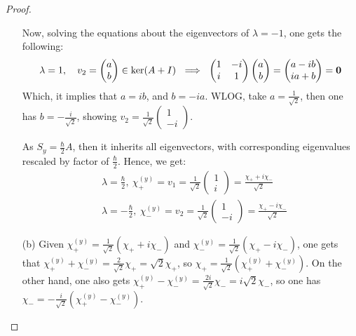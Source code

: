 \documentclass{article}
\begin{document}
\begin{proof}
\begin{itemize}
        Now, solving the equations about the eigenvectors of $\lambda=-1$, one gets the following:
        \begin{align}
            \lambda=1,\quad v_2=\begin{pmatrix}
                a\\b
            \end{pmatrix} \in \ker(A+I)\ \implies\ \begin{pmatrix}
                1&-i\\i&1
            \end{pmatrix}\begin{pmatrix}
                a\\b
            \end{pmatrix} = \begin{pmatrix}
                a-ib\\ia+b
            \end{pmatrix}=\bzero
        \end{align}
        Which, it implies that $a=ib$, and $b = -ia$. WLOG, take $a=\frac{1}{\sqrt{2}}$, then one has $b = -\frac{i}{\sqrt{2}}$, showing $v_2 = \frac{1}{\sqrt{2}}\begin{pmatrix}
            1\\-i
        \end{pmatrix}$.

        As $S_y = \frac{\hbar}{2}A$, then it inherits all eigenvectors, with corresponding eigenvalues rescaled by factor of $\frac{\hbar}{2}$. Hence, we get:
        \begin{align}
            &\lambda = \frac{\hbar}{2},\ \chi_+^{(y)} = v_1 = \frac{1}{\sqrt{2}}\begin{pmatrix}
                1\\i
            \end{pmatrix} = \frac{\chi_++i\chi_-}{\sqrt{2}}\\
            &\lambda = -\frac{\hbar}{2},\ \chi_-^{(y)} = v_2 = \frac{1}{\sqrt{2}}\begin{pmatrix}
                1\\-i
            \end{pmatrix} = \frac{\chi_+-i\chi_-}{\sqrt{2}}
        \end{align}

        \hfil

        \item[(b)] Given $\chi_+^{(y)} = \frac{1}{\sqrt{2}}(\chi_++i\chi_-)$ and $\chi_-^{(y)}=\frac{1}{\sqrt{2}}(\chi_+-i\chi_-)$, one gets that $\chi_+^{(y)}+\chi_-^{(y)} = \frac{2}{\sqrt{2}}\chi_+ = \sqrt{2}\chi_+$, so $\chi_+ = \frac{1}{\sqrt{2}}(\chi_+^{(y)}+\chi_-^{(y)})$. On the other hand, one also gets $\chi_+^{(y)}-\chi_-^{(y)} = \frac{2i}{\sqrt{2}}\chi_- = i\sqrt{2}\chi_-$, so one has $\chi_- = -\frac{i}{\sqrt{2}}(\chi_+^{(y)}-\chi_-^{(y)})$.
        

\end{itemize}
\end{proof}
\end{document}
